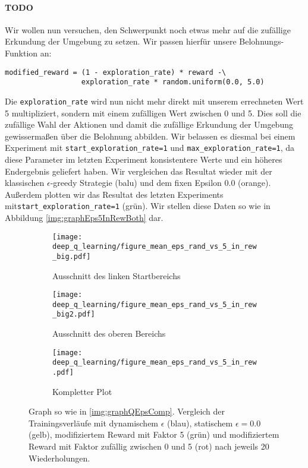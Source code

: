 \paragraph{TODO}
Wir wollen nun versuchen, den Schwerpunkt noch etwas mehr auf die zufällige Erkundung der Umgebung zu setzen. Wir passen hierfür unsere Belohnungs-Funktion an:
\begin{verbatim}
modified_reward = (1 - exploration_rate) * reward -\
                  exploration_rate * random.uniform(0.0, 5.0)
\end{verbatim}
Die \texttt{exploration_rate} wird nun nicht mehr direkt mit unserem errechneten Wert 5 multipliziert, sondern mit einem zufälligen Wert zwischen 0 und 5. Dies soll die zufällige Wahl der Aktionen und damit die zufällige Erkundung der Umgebung gewissermaßen über die Belohnung abbilden. Wir belassen es diesmal bei einem Experiment mit \texttt{start_exploration_rate=1} und \texttt{max_exploration_rate=1}, da diese Parameter im letzten Experiment konsistentere Werte und ein höheres Endergebnis geliefert haben. Wir vergleichen das Resultat wieder mit der klassischen $ \epsilon $-greedy Strategie (balu) und dem fixen Epsilon 0.0 (orange). Außerdem plotten wir das Resultat des letzten Experiments mit\linebreak\texttt{start_exploration_rate=1} (grün). Wir stellen diese Daten so wie in Abbildung \ref{img:graphEps5InRewBoth} dar.

\begin{figure}[h!]
    \centering
    \begin{subfigure}[b]{0.49\textwidth}
        \texttt{[image: deep\_q\_learning/figure\_mean\_eps\_rand\_vs\_5\_in\_rew\_big.pdf]}
        \caption{Ausschnitt des linken Startbereichs}
        \label{img:graphEpsRandVs5InRewBig}
    \end{subfigure}
    \begin{subfigure}[b]{0.49\textwidth}
        \texttt{[image: deep\_q\_learning/figure\_mean\_eps\_rand\_vs\_5\_in\_rew\_big2.pdf]}
        \caption{Ausschnitt des oberen Bereichs}
        \label{img:graphEpsRandVs5InRewBig2}
    \end{subfigure}
    \begin{subfigure}[b]{0.7\textwidth}
        \texttt{[image: deep\_q\_learning/figure\_mean\_eps\_rand\_vs\_5\_in\_rew.pdf]}
        \caption{Kompletter Plot}
        \label{img:graphEpsRandVs5InRew}
    \end{subfigure}
    \caption{Graph so wie in \ref{img:graphQEpsComp}. Vergleich der Trainingsverläufe mit dynamischem $ \epsilon $ (blau), statischem $ \epsilon = 0.0 $ (gelb), modifiziertem Reward mit Faktor 5 (grün) und modifiziertem Reward mit Faktor zufällig zwischen 0 und 5 (rot) nach jeweils 20 Wiederholungen.}
    \label{img:graphEpsRandVs5InRewBoth}
\end{figure}

